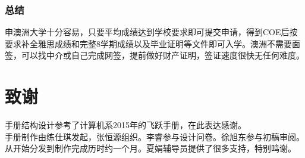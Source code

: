 \documentclass[a4paper,UTF8]{book}
\begin{document}
    \subsection*{总结}
    申澳洲大学十分容易，只要平均成绩达到学校要求即可提交申请，得到COE后按要求补全雅思成绩和完整8学期成绩以及毕业证明等文件即可入学。澳洲不需要面签，可以找中介或自己完成网签，提前做好财产证明，签证速度很快无任何难度。
    

\chapter{致谢}
手册结构设计参考了计算机系2015年的飞跃手册，在此表达感谢。\\

手册制作由练仕琪发起，张恒源组织。李睿参与设计问卷。徐旭东参与初稿审阅。从开始分发到制作完成历时约一个月。夏娟辅导员提供了很多支持，特别鸣谢。
\end{document}
